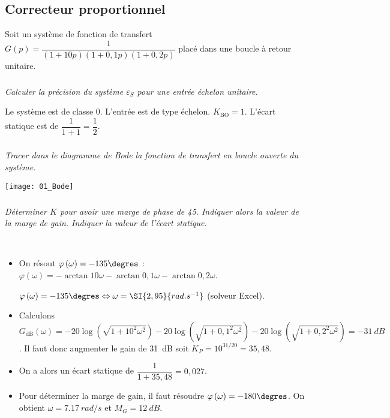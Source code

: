 \begin{multicols}{2}
\fi
\subsection*{Correcteur proportionnel}
Soit un système de fonction de transfert $G(p)=\dfrac{1}{\left(1+10p\right)\left(1+0,1p\right)\left(1+0,2p\right)}$ placé dans une boucle à retour unitaire.

\subparagraph{}\textit{Calculer la précision du système $\varepsilon_S$ pour une entrée échelon unitaire.}
\ifprof
\begin{corrige}
Le système est de classe 0. L'entrée est de type échelon. $K_{\text{BO}}=1$.
L'écart statique est de $\dfrac{1}{1+1}=\dfrac{1}{2}$.
\end{corrige}
\else
\fi

\subparagraph{}\textit{Tracer dans  le diagramme de Bode la fonction de transfert en boucle ouverte du système.}
\ifprof
\begin{corrige}
\begin{center}
\texttt{[image: 01\_Bode]}
\end{center}
\end{corrige}
\else
\fi


\subparagraph{}\textit{Déterminer $K$ pour avoir une marge de phase de 45\degres. Indiquer alors la valeur de la marge de gain. Indiquer la valeur de l'écart statique.}

\ifprof
\begin{corrige} ~\\

\begin{itemize}
\item On résout $\varphi\left(\omega\right)=-135\degres$ : 
$\varphi\left(\omega\right)=-\arctan 10\omega-\arctan 0,1\omega-\arctan 0,2\omega$.

$\varphi\left(\omega\right)=-135\degres \Leftrightarrow \omega = \SI{2,95}{rad.s^{-1}}$ (solveur Excel). 

\item Calculons $G_{\text{dB}}(\omega)=-20\log\left(\sqrt{1+10^2\omega^2} \right)-20\log\left(\sqrt{1+0,1^2\omega^2} \right)-20\log\left(\sqrt{1+0,2^2\omega^2} \right)=\SI{-31}{dB}$. Il faut donc augmenter le gain de \SI{31}{dB} soit $K_P=10^{31/20}=35,48$.


\item On a alors un écart statique de $\dfrac{1}{1+35,48}=0,027$.

\item Pour déterminer la marge de gain, il faut résoudre $\varphi\left(\omega\right)=-180\degres$. On obtient $\omega=\SI{7,17}{rad/s}$ et $M_G=\SI{12}{dB}$.
\end{itemize}



\end{corrige}
\end{multicols}
